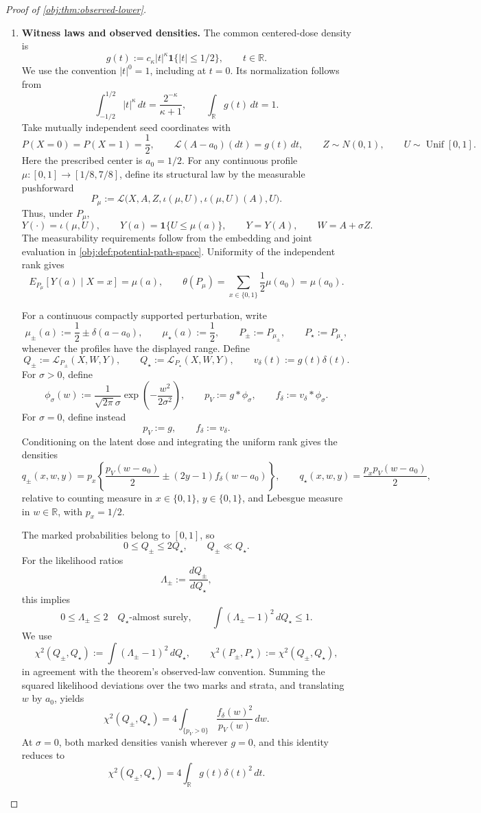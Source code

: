 \begin{proof}[Proof of \cref{obj:thm:observed-lower}]
\begin{enumerate}
\item \textbf{Witness laws and observed densities.}
The common centered-dose density is
\[
g(t):=c_\kappa|t|^\kappa\mathbf1\{|t|\le1/2\},
\qquad t\in\mathbb R.
\]
We use the convention \(|t|^0=1\), including at \(t=0\). Its normalization follows from
\[
\int_{-1/2}^{1/2}|t|^\kappa\,dt
=\frac{2^{-\kappa}}{\kappa+1},
\qquad
\int_{\mathbb R}g(t)\,dt=1.
\]
Take mutually independent seed coordinates with
\[
P(X=0)=P(X=1)=\frac12,\qquad
\mathcal L(A-a_0)(dt)=g(t)\,dt,\qquad
Z\sim N(0,1),\qquad U\sim\operatorname{Unif}[0,1].
\]
Here the prescribed center is \(a_0=1/2\). For any continuous profile
\(\mu:[0,1]\to[1/8,7/8]\), define its structural law by the measurable pushforward
\[
P_\mu:=
\mathcal L\bigl(X,A,Z,\iota(\mu,U),\iota(\mu,U)(A),U\bigr).
\]
Thus, under \(P_\mu\),
\[
Y(\cdot)=\iota(\mu,U),\qquad
Y(a)=\mathbf1\{U\le\mu(a)\},\qquad
Y=Y(A),\qquad W=A+\sigma Z.
\]
The measurability requirements follow from the embedding and joint evaluation in \cref{obj:def:potential-path-space}. Uniformity of the independent rank gives
\[
E_{P_\mu}[Y(a)\mid X=x]=\mu(a),
\qquad
\theta(P_\mu)=\sum_{x\in\{0,1\}}\frac12\mu(a_0)=\mu(a_0).
\]

For a continuous compactly supported perturbation, write
\[
\mu_\pm(a):=\frac12\pm\delta(a-a_0),\qquad
\mu_\star(a):=\frac12,\qquad
P_\pm:=P_{\mu_\pm},\qquad P_\star:=P_{\mu_\star},
\]
whenever the profiles have the displayed range. Define
\[
Q_\pm:=\mathcal L_{P_\pm}(X,W,Y),\qquad
Q_\star:=\mathcal L_{P_\star}(X,W,Y),\qquad
v_\delta(t):=g(t)\delta(t).
\]
For \(\sigma>0\), define
\[
\phi_\sigma(w):=
\frac{1}{\sqrt{2\pi}\sigma}
\exp\left(-\frac{w^2}{2\sigma^2}\right),
\qquad
p_V:=g*\phi_\sigma,\qquad f_\delta:=v_\delta*\phi_\sigma.
\]
For \(\sigma=0\), define instead
\[
p_V:=g,\qquad f_\delta:=v_\delta.
\]
Conditioning on the latent dose and integrating the uniform rank gives the densities
\[
q_\pm(x,w,y)
=
p_x\left\{\frac{p_V(w-a_0)}2
\pm(2y-1)f_\delta(w-a_0)\right\},
\qquad
q_\star(x,w,y)=\frac{p_xp_V(w-a_0)}2,
\]
relative to counting measure in \(x\in\{0,1\}\), \(y\in\{0,1\}\), and Lebesgue measure in \(w\in\mathbb R\), with \(p_x=1/2\).

The marked probabilities belong to \([0,1]\), so
\[
0\le Q_\pm\le2Q_\star,\qquad Q_\pm\ll Q_\star.
\]
For the likelihood ratios
\[
\Lambda_\pm:=\frac{dQ_\pm}{dQ_\star},
\]
this implies
\[
0\le\Lambda_\pm\le2\quad Q_\star\text{-almost surely},
\qquad
\int(\Lambda_\pm-1)^2\,dQ_\star\le1.
\]
We use
\[
\chi^2(Q_\pm,Q_\star):=
\int(\Lambda_\pm-1)^2\,dQ_\star,
\qquad
\chi^2(P_\pm,P_\star):=\chi^2(Q_\pm,Q_\star),
\]
in agreement with the theorem's observed-law convention. Summing the squared likelihood deviations over the two marks and strata, and translating \(w\) by \(a_0\), yields
\[
\chi^2(Q_\pm,Q_\star)
=
4\int_{\{p_V>0\}}\frac{f_\delta(w)^2}{p_V(w)}\,dw.
\]
At \(\sigma=0\), both marked densities vanish wherever \(g=0\), and this identity reduces to
\[
\chi^2(Q_\pm,Q_\star)
=4\int_{\mathbb R}g(t)\delta(t)^2\,dt.
\]


\end{enumerate}
\end{proof}

